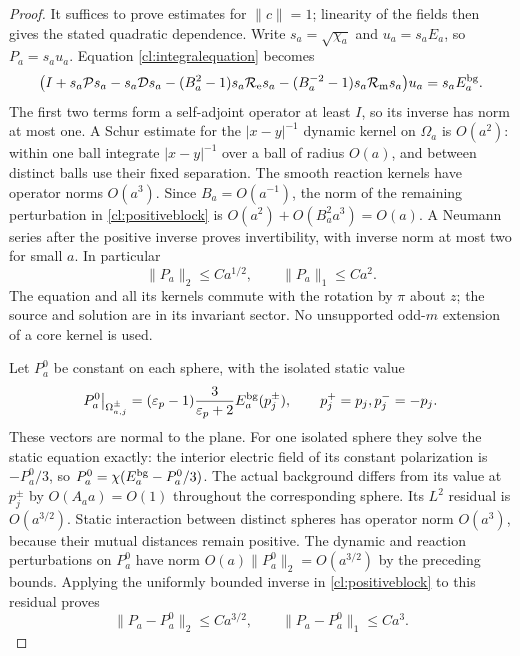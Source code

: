 \begin{proof}
It suffices to prove estimates for $\|c\|=1$; linearity of the
fields then gives the stated quadratic dependence. Write
$s_a=\sqrt{\chi_a}$ and $u_a=s_aE_a$, so $P_a=s_au_a$.
Equation \eqref{cl:integralequation} becomes
\begin{equation}\label{cl:positiveblock}
 \bigl(I+s_a\mathcal P s_a-s_a\mathcal D s_a
 -(B_a^2-1)s_a\mathcal R_{\rm e}s_a
 -(B_a^{-2}-1)s_a\mathcal R_{\rm m}s_a\bigr)u_a
      =s_aE^{\rm bg}_a.
\end{equation}
The first two terms form a self-adjoint operator at least $I$,
so its inverse has norm at most one. A Schur estimate for the
$|x-y|^{-1}$ dynamic kernel on $\Omega_a$ is $O(a^2)$:
within one ball integrate $|x-y|^{-1}$ over a ball of radius
$O(a)$, and between distinct balls use their fixed separation.
The smooth reaction kernels have operator norms $O(a^3)$.
Since $B_a=O(a^{-1})$, the norm of the remaining perturbation
in \eqref{cl:positiveblock} is $O(a^2)+O(B_a^2a^3)=O(a)$.
A Neumann series after the positive inverse proves invertibility,
with inverse norm at most two for small $a$. In particular
\begin{equation}\label{cl:sourcebounds}
 \|P_a\|_2\leq C a^{1/2},\qquad \|P_a\|_1\leq C a^2.
\end{equation}
The equation and all its kernels commute with the rotation by
$\pi$ about $z$; the source and solution are in its invariant
sector. No unsupported odd-$m$ extension of a core kernel is used.

Let $P_a^0$ be constant on each sphere, with the isolated static
value
\begin{equation}\label{cl:leadingP}
 P_a^0\big|_{\Omega_{a,j}^{\pm}}
   =(\varepsilon_p-1)\frac3{\varepsilon_p+2}
       E^{\rm bg}_a(p_j^{\pm}),\qquad p_j^+=p_j, p_j^-=-p_j.
\end{equation}
These vectors are normal to the plane. For one isolated sphere
they solve the static equation exactly: the interior electric
field of its constant polarization is $-P_a^0/3$, so
$P_a^0=\chi(E^{\rm bg}_a-P_a^0/3)$.
The actual background differs from its value at $p_j^{\pm}$
by $O(A_aa)=O(1)$ throughout the corresponding sphere. Its
$L^2$ residual is $O(a^{3/2})$.
Static interaction between distinct spheres has operator norm
$O(a^3)$, because their mutual distances remain positive.
The dynamic and reaction perturbations on $P_a^0$ have norm
$O(a)\|P_a^0\|_2=O(a^{3/2})$ by the preceding bounds.
Applying the uniformly bounded inverse in \eqref{cl:positiveblock}
to this residual proves
\begin{equation}\label{cl:sourceerror}
 \|P_a-P_a^0\|_2\leq C a^{3/2},\qquad
 \|P_a-P_a^0\|_1\leq C a^3.
\end{equation}


\end{proof}
